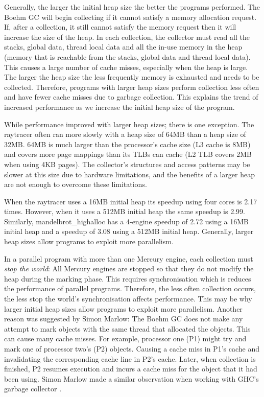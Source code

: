 Generally, the larger the initial heap size the better the programs
performed.
The Boehm GC will begin collecting if it cannot satisfy a memory allocation
request.
If, after a collection, it still cannot satisfy the memory request then it
will increase the size of the heap.
In each collection,
the collector must read all the stacks, global data, thread local data and
all the in-use memory in the heap 
(memory that is reachable from the stacks, global data and thread local
data).
This causes a large number of cache misses, especially when the heap is
large.
The larger the heap size the less frequently memory is exhausted and needs to
be collected.
Therefore,
programs with larger heap sizes perform collection less often and
have fewer cache misses due to garbage collection.
This explains the trend of increased performance as we increase the initial
heap size of the program.

While performance improved with larger heap sizes; there is one exception.
The raytracer often ran more slowly with a heap size of 64MB
than a heap size of 32MB.
64MB is much larger than the processor's cache size (L3 cache is 8MB) and
covers more page mappings than its TLBs can cache (L2 TLB covers 2MB when
using 4KB pages).
The collector's structures and access patterns may be slower at this size
due to hardware limitations,
and the benefits of a larger heap are not enough to overcome these
limitations.

When the raytracer uses a 16MB initial heap its speedup using four
cores is 2.17 times.
However, when it uses a 512MB initial heap the same speedup is 2.99.
Similarly,
mandelbrot\_highalloc has a 4-engine speedup of 2.72 using a 16MB initial
heap and a speedup of 3.08 using a 512MB initial heap.
Generally,
larger heap sizes allow programs to exploit more parallelism.

In a parallel program with more than one Mercury engine,
each collection must \emph{stop the world}:
All Mercury engines are stopped so that they do not modify the heap during
the marking phase.
This requires synchronisation which is reduces the performance of parallel
programs.
Therefore, the less often collection occurs, the less stop the world's
synchronisation affects performance.
This may be why larger initial heap sizes allow programs to exploit more
parallelism.
Another reason was suggested by Simon Marlow:
The Boehm GC does not make any attempt to mark objects with the same thread
that allocated the objects.
This can cause many cache misses.
For example, processor one (P1) might try and mark one of processor two's
(P2) objects.
Causing a cache miss in P1's cache and invalidating the corresponding cache
line in P2's cache.
Later, when collection is finished,
P2 resumes execution and incurs a cache miss for the object that it had been
using.
Simon Marlow made a similar observation when working with GHC's garbage
collector \cite{marlow-gc}.

